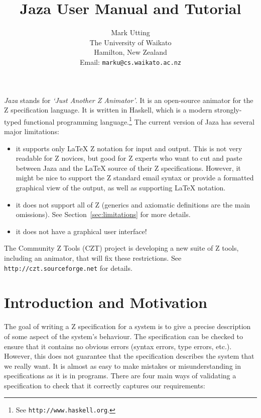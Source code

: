 \documentclass[11pt]{article}
\title{Jaza User Manual and Tutorial}
\author{Mark Utting \\ 
  The University of Waikato \\
  Hamilton, New Zealand \\
  Email: \texttt{marku@cs.waikato.ac.nz}}
\newcommand{\Jaza}{Jaza}
\newcommand{\url}[1]{\texttt{#1}}
\begin{document}
\maketitle

\emph{Jaza} stands for \emph{`Just Another Z Animator'}.
It is an open-source animator for the Z specification language.
It is written in Haskell, which is a modern strongly-typed
functional programming language.\footnote{See
  \url{http://www.haskell.org}.}
The current version of {\Jaza} has several major
limitations:
\begin{itemize}
\item it supports only {\LaTeX} Z notation for input and output.
  This is not very readable for Z novices, but good for Z experts 
  who want to cut and paste between {\Jaza} and the {\LaTeX}
  source of their Z specifications.
  However, it might be nice to support the Z standard email syntax
  or provide a formatted graphical view of the output, as well
  as supporting {\LaTeX} notation.
\item it does not support all of Z (generics and axiomatic definitions
  are the main omissions).  See Section~\ref{sec:limitations} for more details.
\item it does not have a graphical user interface!
\end{itemize}

The Community Z Tools (CZT) project is developing a new suite
of Z tools, including an animator, that will fix these restrictions.
See \url{http://czt.sourceforge.net} for details.


\section{Introduction and Motivation} \label{sec:intro}

The goal of writing a Z specification for a system is to
give a precise description of some aspect of the system's behaviour.
The specification can be checked to ensure that it contains no
obvious errors (syntax errors, type errors, etc.).
However, this does not guarantee that the specification describes
the system that we really want.  It is almost as easy to make
mistakes or misunderstanding in specifications as it is in programs.
There are four main ways of validating a specification to check
that it correctly captures our requirements: 
\end{document}
